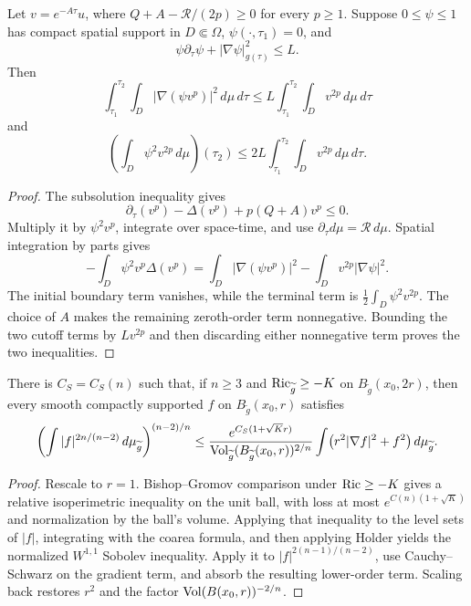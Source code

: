 \begin{lemma}
\label{lem:chow-iii-reverse-poincare}

Let \(v=e^{-A\tau}u\), where
\(Q+A-\mathcal R/(2p)\geq0\) for every \(p\geq1\).  Suppose
\(0\leq\psi\leq1\) has compact spatial support in \(D\Subset\Omega\),
\(\psi(\cdot,\tau_1)=0\), and
\[
 \psi\partial_\tau\psi+|\nabla\psi|_{g(\tau)}^2\leq L.
\]
Then
\[
 \int_{\tau_1}^{\tau_2}\int_D|\nabla(\psi v^p)|^2\,d\mu\,d\tau
 \leq L\int_{\tau_1}^{\tau_2}\int_Dv^{2p}\,d\mu\,d\tau
\]
and
\[
 \left(\int_D\psi^2v^{2p}\,d\mu\right)(\tau_2)
 \leq2L\int_{\tau_1}^{\tau_2}\int_Dv^{2p}\,d\mu\,d\tau.
\]
\end{lemma}
\begin{proof}
\sketch The subsolution inequality gives
\[
 \partial_\tau(v^p)-\Delta(v^p)+p(Q+A)v^p\leq0.
\]
Multiply it by \(\psi^2v^p\), integrate over space-time, and use
\(\partial_\tau d\mu=\mathcal R\,d\mu\).  Spatial integration by parts gives
\[
 -\int_D\psi^2v^p\Delta(v^p)
 =\int_D|\nabla(\psi v^p)|^2-\int_Dv^{2p}|\nabla\psi|^2.
\]
The initial boundary term vanishes, while the terminal term is
\(\frac12\int_D\psi^2v^{2p}\).  The choice of \(A\) makes the remaining
zeroth-order term nonnegative.  Bounding the two cutoff terms by \(Lv^{2p}\)
and then discarding either nonnegative term proves the two inequalities.
\end{proof}

\begin{proposition}
\label{prop:chow-iii-local-sobolev-ball}

There is \(C_S=C_S(n)\) such that, if \(n\geq3\) and
\(\operatorname{Ric}_{\widetilde g}\geq-K\) on \(B_{\widetilde g}(x_0,2r)\), then every
smooth compactly supported \(f\) on \(B_{\widetilde g}(x_0,r)\) satisfies
\[
 \left(\int |f|^{2n/(n-2)}\,d\mu_{\widetilde g}\right)^{(n-2)/n}
 \leq
 \frac{e^{C_S(1+\sqrt K r)}}
 {\operatorname{Vol}_{\widetilde g}(B_{\widetilde g}(x_0,r))^{2/n}}
 \int\bigl(r^2|\nabla f|^2+f^2\bigr)\,d\mu_{\widetilde g}.
\]
\end{proposition}
\begin{proof}
\sketch Rescale to \(r=1\).  Bishop--Gromov comparison under
\(\operatorname{Ric}\geq-K\) gives a relative isoperimetric inequality on the unit ball,
with loss at most \(e^{C(n)(1+\sqrt K)}\) and normalization by the ball's
volume.  Applying that inequality to the level sets of \(|f|\), integrating
with the coarea formula, and then applying Holder yields the normalized
\(W^{1,1}\) Sobolev inequality.  Apply it to
\(|f|^{2(n-1)/(n-2)}\), use Cauchy--Schwarz on the gradient term, and absorb
the resulting lower-order term.  Scaling back restores \(r^2\) and the
factor \(\operatorname{Vol}(B(x_0,r))^{-2/n}\).
\end{proof}

